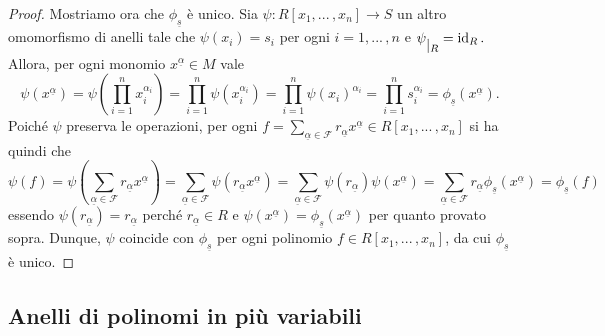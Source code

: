 \documentclass{article}
\theoremstyle{definition}
\newcommand{\valpha}{\underline{\alpha}}
\begin{document}
\begin{proof}
\vspace{2mm}

\noindent Mostriamo ora che $\phi_{\underline{s}}$ è unico. Sia $\psi\colon R[x_1,...\,,x_n]\to S$ un altro omomorfismo di anelli tale che $\psi(x_i)=s_i$ per ogni $i=1,...\,,n$ e $\psi \raisebox{-.5em}{$\vert_{R}$}= \operatorname{id}_R.$ Allora, per ogni monomio $x^{\valpha}\in M$ vale $$\psi(x^{\valpha})=\psi\left(\prod\limits_{i=1}^n x_i^{\alpha_i}\right)=\prod\limits_{i=1}^n \psi\left(x_i^{\alpha_i}\right)=\prod\limits_{i=1}^n \psi(x_i)^{\alpha_i}=\prod\limits_{i=1}^n s_i^{\alpha_i}=\phi_{\underline{s}}(x^{\valpha}).$$ Poiché $\psi$ preserva le operazioni, per ogni $f=\sum\limits_{\valpha\in \mathcal{F}} r_{\valpha}x^{\valpha}\in R[x_1,...\,,x_n]$ si ha quindi che \[ \psi(f)=\psi\left(\sum\limits_{\valpha\in \mathcal{F}} r_{\valpha}x^{\valpha}\right)=\sum\limits_{\valpha\in \mathcal{F}} \psi(r_{\valpha}x^{\valpha})=\sum\limits_{\valpha\in \mathcal{F}} \psi(r_{\valpha})\psi(x^{\valpha})=\sum\limits_{\valpha\in \mathcal{F}} r_{\valpha}\phi_{\underline{s}}(x^{\valpha})=\phi_{\underline{s}}(f)\] essendo $\psi(r_{\valpha})=r_{\valpha}$ perché $r_{\valpha}\in R$ e $\psi(x^{\valpha})=\phi_{\underline{s}}(x^{\valpha})$ per quanto provato sopra. Dunque, $\psi$ coincide con $\phi_{\underline{s}}$ per ogni polinomio $f\in R[x_1,...\,,x_n]$, da cui $\phi_{\underline{s}}$ è unico.\end{proof}

\subsection{Anelli di polinomi in più variabili}
\end{document}
